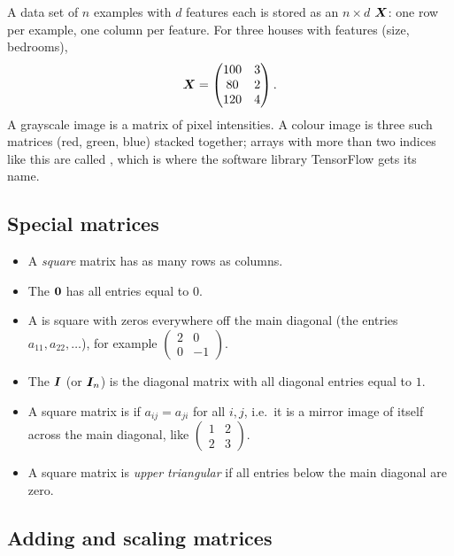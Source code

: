 \begin{mlnote}
A data set of $n$ examples with $d$ features each is stored as an $n\times d$
 $\bm{X}$: one row per example, one column per feature. For
three houses with features (size, bedrooms),
\[
  \bm{X} = \begin{pmatrix} 100 & 3\\ 80 & 2\\ 120 & 4 \end{pmatrix}.
\]
A grayscale image is a matrix of pixel intensities. A colour image is three
such matrices (red, green, blue) stacked together; arrays with more than two
indices like this are called , which is where the
software library TensorFlow gets its name.
\end{mlnote}

\subsection{Special matrices}

\begin{itemize}
  \item A \emph{square} matrix has as many rows as columns.
  \item The  $\bm{0}$ has all entries equal to $0$.
  \item A  is square with zeros everywhere off the main
    diagonal (the entries $a_{11}, a_{22}, \dots$), for example
    $\left(\begin{smallmatrix} 2 & 0\\ 0 & -1\end{smallmatrix}\right)$.
  \item The  $\bm{I}$ (or $\bm{I}_n$) is the diagonal matrix
    with all diagonal entries equal to $1$.
  \item A square matrix is  if
    $a_{ij} = a_{ji}$ for all $i, j$, i.e.\ it is a mirror image of itself
    across the main diagonal, like
    $\left(\begin{smallmatrix} 1 & 2\\ 2 & 3\end{smallmatrix}\right)$.
  \item A square matrix is \emph{upper triangular} if all entries below the
    main diagonal are zero.
\end{itemize}

\subsection{Adding and scaling matrices}

